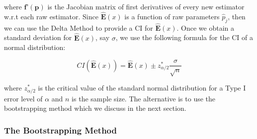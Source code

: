 \documentclass[12pt]{article}         %
\begin{document}
where $\textbf{f'}(\textbf{p})$ is the Jacobian matrix of first derivatives of every new estimator w.r.t each raw estimator. Since $\mathbf{\hat{E}}(x)$ is a function of raw parameters $\hat{p}_j$, then we can use the Delta Method to provide a CI for $\mathbf{\hat{E}}(x)$. Once we obtain a standard deviation for $\mathbf{\hat{E}}(x)$, say $\sigma$, we use the following formula for the CI of a normal distribution:

\begin{equation}
CI(\mathbf{\hat{E}}(x)) = \mathbf{\hat{E}}(x) \pm z^{*}_{\alpha /2}\dfrac{\sigma}{\sqrt n}
\end{equation}

where $z^{*}_{\alpha /2}$ is the critical value of the standard normal distribution for a Type I error level of $\alpha$ and $n$ is the sample size. The alternative is to use the bootstrapping method which we discuss in the next section.

\newpage

\subsubsection{The Bootstrapping Method}
\end{document}
